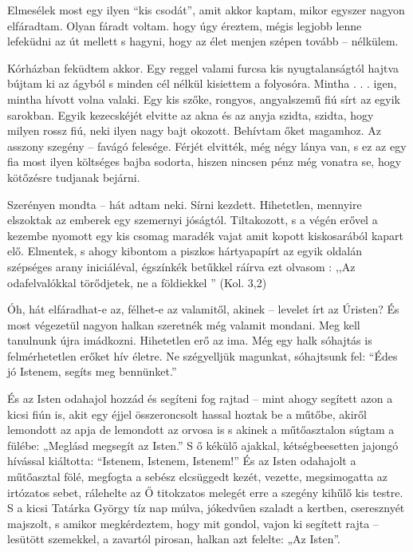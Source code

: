 \documentclass{IEEEtran}
\begin{document}
Elmesélek most egy ilyen “kis csodát”, amit akkor kaptam, mikor egyszer nagyon
elfáradtam. Olyan fáradt voltam. hogy úgy éreztem, mégis legjobb lenne
lefeküdni az út mellett s hagyni, hogy az élet menjen szépen tovább –
nélkülem.

Kórházban feküdtem akkor. Egy reggel valami furcsa kis nyugtalanságtól hajtva
bújtam ki az ágyból s minden cél nélkül kisiettem a folyosóra. Mintha . . .
igen, mintha hívott volna valaki. Egy kis szőke, rongyos, angyalszemű fiú sírt
az egyik sarokban. Egyik kezecskéjét elvitte az akna és az anyja szidta,
szidta, hogy milyen rossz fiú, neki ilyen nagy bajt okozott. Behívtam őket
magamhoz. Az asszony szegény – favágó felesége. Férjét elvitték, még négy
lánya van, s ez az egy fia most ilyen költséges bajba sodorta, hiszen nincsen
pénz még vonatra se, hogy kötőzésre tudjanak bejárni.

Szerényen mondta – hát adtam neki. Sírni kezdett. Hihetetlen, mennyire
elszoktak az emberek egy szemernyi jóságtól. Tiltakozott, s a végén erővel a
kezembe nyomott egy kis csomag maradék vajat amit kopott kiskosarából kapart
elő. Elmentek, s ahogy kibontom a piszkos hártyapapírt az egyik oldalán
szépséges arany iniciáléval, égszínkék betűkkel ráírva ezt olvasom : ,,Az
odafelvalókkal törődjetek, ne a földiekkel ” (Kol. 3,2)

Óh, hát elfáradhat-e az, félhet-e az valamitől, akinek – levelet írt az
Úristen?
És most végezetül nagyon halkan szeretnék még valamit mondani. Meg kell
tanulnunk újra imádkozni. Hihetetlen erő az ima. Még egy halk sóhajtás is
felmérhetetlen erőket hív életre. Ne szégyelljük magunkat, sóhajtsunk fel:
“Édes jó Istenem, segíts meg bennünket.”

És az Isten odahajol hozzád és segíteni fog rajtad – mint ahogy segített azon
a kicsi fiún is, akit egy éjjel összeroncsolt hassal hoztak be a műtőbe,
akiről lemondott az apja de lemondott az orvosa is s akinek a műtőasztalon
súgtam a fülébe: „Meglásd megsegít az Isten.” S ő kékülő ajakkal,
kétségbeesetten jajongó hívással kiáltotta: “Istenem, Istenem, Istenem!” És az
Isten odahajolt a műtőasztal fölé, megfogta a sebész elcsüggedt kezét,
vezette, megsimogatta az irtózatos sebet, rálehelte az Ő titokzatos melegét
erre a szegény kihűlő kis testre. S a kicsi Tatárka György tíz nap múlva,
jókedvűen szaladt a kertben, cseresznyét majszolt, s amikor megkérdeztem, hogy
mit gondol, vajon ki segített rajta – lesütött szemekkel, a zavartól pirosan,
halkan azt felelte: „Az Isten”.
\end{document}
